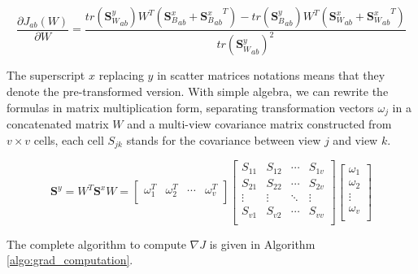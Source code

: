         \begin{equation}
            \frac{\partial J_{ab}\left(W\right)}{\partial W}=\frac{tr\left({\boldsymbol{S}_W^y}_{ab}\right)W^T\left({\boldsymbol{S}_B^x}_{ab}+{{\boldsymbol{S}_B^x}_{ab}}^T\right)-tr\left({\boldsymbol{S}_B^y}_{ab}\right)W^T\left({\boldsymbol{S}_W^x}_{ab}+{{\boldsymbol{S}_W^x}_{ab}}^T\right)}{{tr\left({\boldsymbol{S}_W^y}_{ab}\right)}^2}
            \label{eq:grad_Jab}
        \end{equation}

        The superscript $x$ replacing $y$ in scatter matrices notations means that they denote the pre-transformed version. With simple algebra, we can rewrite the formulas in matrix multiplication form, separating transformation vectors $\omega_j$ in a concatenated matrix $W$ and a multi-view covariance matrix constructed from $v\times v$ cells, each cell $S_{jk}$ stands for the covariance between view $j$ and view $k$.

        \begin{equation}
            \boldsymbol{S}^y=W^T\boldsymbol{S}^xW=\left[\begin{matrix}\omega_1^T&\omega_2^T&\cdots&\omega_v^T\\\end{matrix}\right]\left[\begin{matrix}S_{11}&S_{12}&\cdots&S_{1v}\\S_{21}&S_{22}&\cdots&S_{2v}\\\vdots&\vdots&\ddots&\vdots\\S_{v1}&S_{v2}&\cdots&S_{vv}\\\end{matrix}\right]\left[\begin{matrix}\omega_1\\\omega_2\\\vdots\\\omega_v\\\end{matrix}\right]
        \end{equation}

        The complete algorithm to compute $\nabla J$ is given in Algorithm \ref{algo:grad_computation}.

